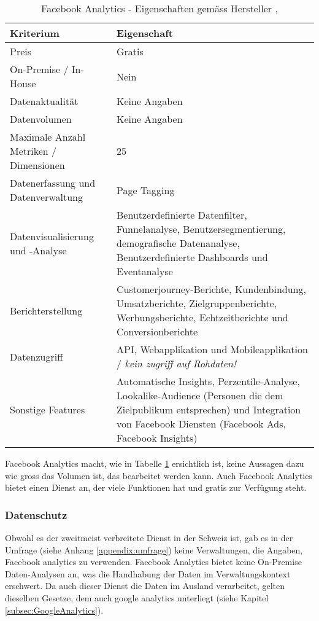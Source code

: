 \begin{table}[h]
	\centering
	\begin{tabular}{ | p{4cm} | p{10cm} |}
		\hline
		\textbf{Kriterium} & \textbf{Eigenschaft}  \\ 
		\hline
    Preis & Gratis \\
    \hline
    On-Premise / In-House & Nein \\
    \hline
    Datenaktualität & Keine Angaben \\
    \hline
		Datenvolumen & Keine Angaben \\
    \hline
    Maximale Anzahl Metriken / Dimensionen & 25 \\
    \hline
		Datenerfassung und Datenverwaltung &  Page Tagging \\
    \hline
    Datenvisualisierung und -Analyse & Benutzerdefinierte Datenfilter, Funnelanalyse, Benutzersegmentierung,  demografische Datenanalyse, Benutzerdefinierte Dashboards und Eventanalyse \\
    \hline
    Berichterstellung & Customerjourney-Berichte, Kundenbindung, Umsatzberichte, Zielgruppenberichte, Werbungsberichte, Echtzeitberichte und Conversionberichte \\
    \hline
    Datenzugriff & API, Webapplikation und Mobileapplikation / \textit{kein zugriff auf Rohdaten!}\\
    \hline
    Sonstige Features & Automatische Insights, Perzentile-Analyse, Lookalike-Audience (Personen die dem Zielpublikum entsprechen) und Integration von Facebook Diensten (Facebook Ads, Facebook Insights) \\
		\hline  
	\end{tabular}
	\caption{Facebook Analytics - Eigenschaften gemäss Hersteller \parencite{facebookAnalyticsFeatures}, \parencite{facebookAnalyticsHelp}}
	\label{tab: facebookAnalyticsFeatures}
\end{table}

Facebook Analytics macht, wie in Tabelle \ref{tab: facebookAnalyticsFeatures} ersichtlich ist, keine Aussagen dazu wie gross das Volumen ist, das bearbeitet werden kann. 
Auch Facebook Analytics bietet einen Dienst an, der viele Funktionen hat und gratis zur Verfügung steht. 

\newpage

\subsubsection{Datenschutz}
Obwohl es der zweitmeist verbreitete Dienst in der Schweiz ist, gab es in der Umfrage (siehe Anhang \ref{appendix:umfrage}) keine Verwaltungen, die Angaben, Facebook analytics zu verwenden. Facebook Analytics bietet keine On-Premise Daten-Analysen an, was die Handhabung der Daten im Verwaltungskontext erschwert. Da auch dieser Dienst die Daten im Ausland verarbeitet, gelten dieselben Gesetze, dem auch google analytics unterliegt (siehe Kapitel \ref{subsec:GoogleAnalytics}). 

